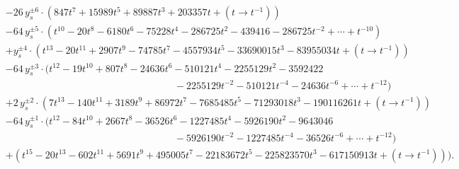 \documentclass[letterpaper, 11pt]{article}
\newcommand{\nn}{\nonumber}
\begin{document}
{\begin{align}
  &-26\,y_s^{\pm6} \cdot (847 t^7+15989 t^5+89887 t^3+203357
  t+ (t\rightarrow t^{-1}) )\nn\\
  &-64\,y_s^{\pm5}\cdot (t^{10}-20 t^8-6180 t^6-75228 t^4-286725
  t^2-439416-{286725}t^{-2} +\cdots + t^{-10})\nn\\
  &+y_s^{\pm4}\cdot (t^{13}-20 t^{11}+2907 t^9-74785 t^7-4557934 t^5-33690015 t^3-83955034 t +  (t\rightarrow t^{-1}) )\nn\\
  &-64\,y_s^{\pm3}\cdot (t^{12}-19 t^{10}+807 t^8-24636 t^6-510121 t^4-2255129
  t^2-3592422\nn\\
  &\qquad\qquad\qquad\qquad\qquad\qquad\qquad\qquad\quad -{2255129}t^{-2}-510121 t^{-4}-24636 t^{-6} + \cdots + t^{-12})\nn\\
  &+2\,y_s^{\pm2}\cdot (7 t^{13}-140 t^{11}+3189 t^9+86972 t^7-7685485 t^5-71293018 t^3-190116261 t + (t\rightarrow t^{-1}))\nn\\
  &-64\,y_s^{\pm1} \cdot (t^{12}-84 t^{10}+2667 t^8-36526 t^6-1227485 t^4-5926190
  t^2-9643046
    \nn\\
  &\qquad\qquad\qquad\qquad\qquad\qquad\qquad\qquad\quad -{5926190}{t^{-2}}-1227485 t^{-4} -36526 t^{-6}+\cdots + t^{-12})\nn\\
  &+(t^{15}-20 t^{13}-602 t^{11}+5691 t^9+495005 t^7-22183672 t^5-225823570 t^3-617150913t+  (t\rightarrow t^{-1}) )\Big).
  \end{align}

}
\end{document}

